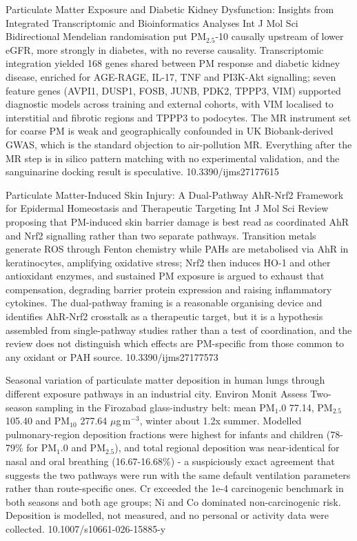 \documentclass[10pt]{article}
\begin{document}
{Particulate Matter Exposure and Diabetic Kidney Dysfunction: Insights from Integrated Transcriptomic and Bioinformatics Analyses}
{Int J Mol Sci}
{Bidirectional Mendelian randomisation put PM$_{2.5}$-10 causally upstream of lower eGFR, more strongly in diabetes, with no reverse causality. Transcriptomic integration yielded 168 genes shared between PM response and diabetic kidney disease, enriched for AGE-RAGE, IL-17, TNF and PI3K-Akt signalling; seven feature genes (AVPI1, DUSP1, FOSB, JUNB, PDK2, TPPP3, VIM) supported diagnostic models across training and external cohorts, with VIM localised to interstitial and fibrotic regions and TPPP3 to podocytes. The MR instrument set for coarse PM is weak and geographically confounded in UK Biobank-derived GWAS, which is the standard objection to air-pollution MR. Everything after the MR step is in silico pattern matching with no experimental validation, and the sanguinarine docking result is speculative.}
{10.3390/ijms27177615}

{Particulate Matter-Induced Skin Injury: A Dual-Pathway AhR-Nrf2 Framework for Epidermal Homeostasis and Therapeutic Targeting}
{Int J Mol Sci}
{Review proposing that PM-induced skin barrier damage is best read as coordinated AhR and Nrf2 signalling rather than two separate pathways. Transition metals generate ROS through Fenton chemistry while PAHs are metabolised via AhR in keratinocytes, amplifying oxidative stress; Nrf2 then induces HO-1 and other antioxidant enzymes, and sustained PM exposure is argued to exhaust that compensation, degrading barrier protein expression and raising inflammatory cytokines. The dual-pathway framing is a reasonable organising device and identifies AhR-Nrf2 crosstalk as a therapeutic target, but it is a hypothesis assembled from single-pathway studies rather than a test of coordination, and the review does not distinguish which effects are PM-specific from those common to any oxidant or PAH source.}
{10.3390/ijms27177573}


{Seasonal variation of particulate matter deposition in human lungs through different exposure pathways in an industrial city.}
{Environ Monit Assess}
{Two-season sampling in the Firozabad glass-industry belt: mean PM$_{1}$.0 77.14, PM$_{2.5}$ 105.40 and PM$_{10}$ 277.64 $\mu$g\,m$^{-3}$, winter about 1.2x summer. Modelled pulmonary-region deposition fractions were highest for infants and children (78-79\% for PM$_{1}$.0 and PM$_{2.5}$), and total regional deposition was near-identical for nasal and oral breathing (16.67-16.68\%) - a suspiciously exact agreement that suggests the two pathways were run with the same default ventilation parameters rather than route-specific ones. Cr exceeded the 1e-4 carcinogenic benchmark in both seasons and both age groups; Ni and Co dominated non-carcinogenic risk. Deposition is modelled, not measured, and no personal or activity data were collected.}
{10.1007/s10661-026-15885-y}
\end{document}
